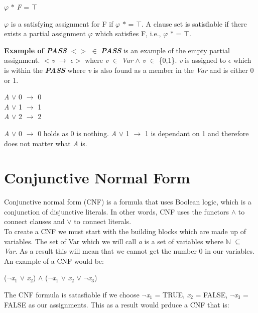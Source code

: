\documentclass[11pt,a4paper]{article}
\begin{document}
\begin{center}
$\varphi$ $\ast$ \textit{F} = $\top$
\end{center}
$\varphi$ is a satisfying assignment for F if $\varphi$ $\ast$ = $\top$. A clause set is satisfiable if there exists a partial assignment $\varphi$ which satisfies F, i.e., $\varphi$ $\ast$ = $\top$. \newline

\textbf{Example of \textbf{\textit{PASS}}}\newline
$<>$ $\in$ \textbf{\textit{PASS}} is an example of the empty partial assignment.\newline
$<$\textit{v} $\rightarrow$ $\epsilon$$>$ where \textit{v} $\in$ \textit{Var} $\land$ \textit{v} $\in$ \{0,1\}. \textit{v} is assigned to $\epsilon$ which is within the \textbf{\textit{PASS}} where \textit{v} is also found as a member in the \textit{Var} and is either 0 or 1. 

\begin{center}
\textit{A} $\lor$ 0 $\rightarrow$ 0 \\
\textit{A} $\lor$ 1 $\rightarrow$ 1 \\
\textit{A} $\lor$ 2 $\rightarrow$ 2
\end{center}
\textit{A} $\lor$ 0 $\rightarrow$ 0 holds as 0 is nothing. \textit{A} $\lor$ 1 $\rightarrow$ 1 is dependant on 1 and therefore does not matter what \textit{A} is.

\newpage
\section{Conjunctive Normal Form}
Conjunctive normal form (CNF) is a formula that uses Boolean logic, which is a conjunction of disjunctive literals. In other words, CNF uses the functors $\land$ to connect clauses and $\lor$ to connect literals. \\
To create a CNF we must start with the building blocks which are made up of variables. The set of Var which we will call \textit{a} is a set of variables where $\mathbb{N}$ $\subseteq$ \textit{Var}. As a result this will mean that we cannot get the number 0 in our variables.\\
An example of a CNF would be:

\begin{center}
($\neg$\textit{x}$_1$ $\lor$ \textit{x}$_2$) $\land$ ($\neg$\textit{x}$_1$ $\lor$ \textit{x}$_2$ $\lor$ $\neg$\textit{x}$_3$)
\end{center}
The CNF formula is satasfiable if we choose $\neg$\textit{x}$_1$ = TRUE, \textit{x}$_2$ = FALSE, $\neg$\textit{x}$_3$ = FALSE as our assignments. This as a result would prduce a CNF that is: 
\end{document}
